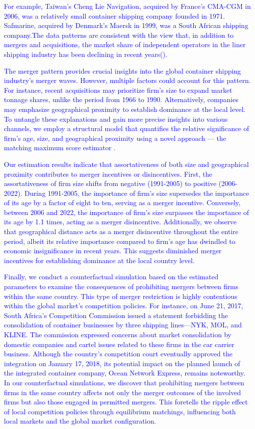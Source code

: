 \documentclass[10pt]{article}
\begin{document}
\textcolor{blue}{For example, Taiwan's Cheng Lie Navigation, acquired by France's CMA-CGM in 2006, was a relatively small container shipping company founded in 1971. Safmarine, acquired by Denmark's Maersk in 1999, was a South African shipping company.The data patterns are consistent with the view that, in addition to mergers and acquisitions, the market share of independent operators in the liner shipping industry has been declining in recent years(\cite{Merk2022MEL}). 

The merger pattern provides crucial insights into the global container shipping industry's merger waves.
However, multiple factors could account for this pattern. 
For instance, recent acquisitions may prioritize firm's size to expand market tonnage shares, unlike the period from 1966 to 1990. Alternatively, companies may emphasize geographical proximity to establish dominance at the local level.
To untangle these explanations and gain more precise insights into various channels, we employ a structural model that quantifies the relative significance of firm's age, size, and geographical proximity using a novel approach — the matching maximum score estimator \cite{fox2018qe}.

Our estimation results indicate that assortativeness of both size and geographical proximity contributes to merger incentives or disincentives. 
First, the assortativeness of firm size shifts from negative (1991-2005) to positive (2006-2022). 
During 1991-2005, the importance of firm's size supersedes the importance of its age by a factor of eight to ten, serving as a merger incentive.
Conversely, between 2006 and 2022, the importance of firm's size surpasses the importance of its age by 1.1 times, acting as a merger disincentive.
Additionally, we observe that geographical distance acts as a merger disincentive throughout the entire period, albeit its relative importance compared to firm's age has dwindled to economic insignificance in recent years. 
This suggests diminished merger incentives for establishing dominance at the local country level.

Finally, we conduct a counterfactual simulation based on the estimated parameters to examine the consequences of prohibiting mergers between firms within the same country.
This type of merger restriction is highly contentious within the global market's competition policies. 
For instance, on June 21, 2017, South Africa's Competition Commission issued a statement forbidding the consolidation of container businesses by three shipping lines—NYK, MOL, and KLINE. 
The commission expressed concerns about market consolidation by domestic companies and cartel issues related to these firms in the car carrier business.
Although the country's competition court eventually approved the integration on January 17, 2018, its potential impact on the planned launch of the integrated container company, Ocean Network Express, remains noteworthy.
In our counterfactual simulations, we discover that prohibiting mergers between firms in the same country affects not only the merger outcomes of the involved firms but also those engaged in permitted mergers. 
This foretells the ripple effect of local competition policies through equilibrium matchings, influencing both local markets and the global market configuration.

}
\end{document}
